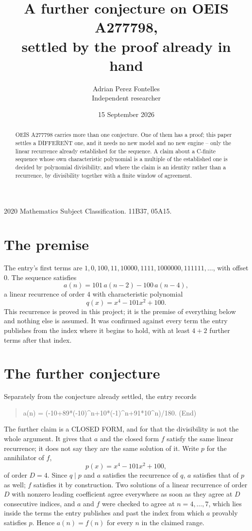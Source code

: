 \documentclass[11pt,a4paper]{article}
\title{A further conjecture on OEIS A277798,\\ \large settled by the proof already in hand}
\author{Adrian Perez Fontelles\\ \small Independent researcher}
\date{15 September 2026}
\theoremstyle{plain}
\theoremstyle{definition}
\begin{document}
\maketitle

\begin{abstract}
OEIS A277798 carries more than one conjecture. One of them has a proof; this paper settles a
DIFFERENT one, and it needs no new model and no new engine -- only the linear recurrence already
established for the sequence. A claim about a C-finite sequence whose own characteristic
polynomial is a multiple of the established one is decided by polynomial divisibility, and where
the claim is an identity rather than a recurrence, by divisibility together with a finite window
of agreement.
\end{abstract}

\noindent\small 2020 Mathematics Subject Classification. 11B37, 05A15.\normalsize

\section{The premise}

The entry's first terms are $1, 0, 100, 11, 10000, 1111, 1000000, 111111,\dots$, with offset $0$. The sequence satisfies
\[
  a(n)=101\,a(n-2) - 100\,a(n-4) ,
\]
a linear recurrence of order $4$ with characteristic polynomial
\[
  q(x)=x^{4} - 101 x^{2} + 100 .
\]
This recurrence is proved in this project; it is the premise of everything below and nothing else is assumed.
It was confirmed against every term the entry publishes from the index where it begins to hold,
with at least $4+2$ further terms after that index.

\section{The further conjecture}

Separately from the conjecture already settled, the entry records

\begin{quote}\raggedright a(n) = (-10+89*(-10)\^{}n+10*(-1)\^{}n+91*10\^{}n)/180. (End)\end{quote}

The further claim is a CLOSED FORM, and for that the divisibility is not the whole argument. It
gives that $a$ and the closed form $f$ satisfy the same linear recurrence; it does not say they
are the same solution of it. Write $p$ for the annihilator of $f$,
\[
  p(x)=x^{4} - 101 x^{2} + 100 ,
\]
of order $D=4$. Since $q\mid p$ and $a$ satisfies the recurrence of $q$, $a$ satisfies that of
$p$ as well; $f$ satisfies it by construction. Two solutions of a linear recurrence of order $D$
with nonzero leading coefficient agree everywhere as soon as they agree at $D$ consecutive
indices, and $a$ and $f$ were checked to agree at $n=4,\dots,7$,
which lies inside the terms the entry publishes and past the index from which $a$ provably
satisfies $p$. Hence $a(n)=f(n)$ for every $n$ in the claimed range.
\end{document}
